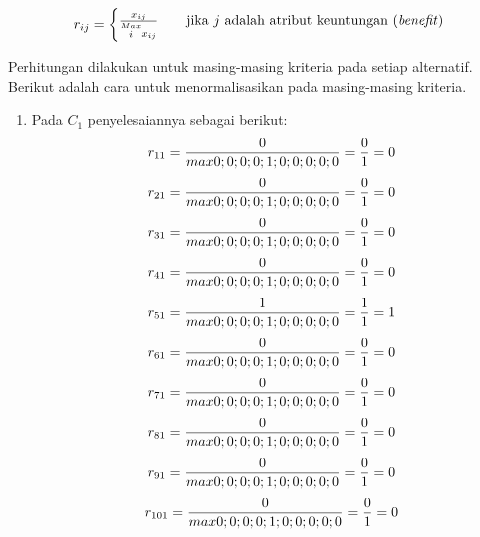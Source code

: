 \documentclass[a4paper,twoside]{article}
\begin{document}
\begin{enumerate}
	\[ r_{ij}  =
  \begin{cases}
    \frac{x_{ij}}{\stackrel{Max}{i} x_{ij}}      & \quad \text{jika } j \text{ adalah atribut keuntungan (\textit{benefit})}\\
	\end{cases}	  
\]

Perhitungan dilakukan untuk masing-masing kriteria pada setiap alternatif. Berikut adalah cara untuk menormalisasikan pada masing-masing kriteria.

\begin{enumerate}
	\item Pada $C_{1}$ penyelesaiannya sebagai berikut:
\begin{displaymath}
r_{11} = \frac{0}{max {0;0;0;0;1;0;0;0;0;0}} = \frac{0}{1} = 0\\
\end {displaymath}
\begin{displaymath}
r_{21} = \frac{0}{max {0;0;0;0;1;0;0;0;0;0}} = \frac{0}{1} = 0\\
\end{displaymath}
\begin{displaymath}
r_{31} = \frac{0}{max {0;0;0;0;1;0;0;0;0;0}} = \frac{0}{1} = 0\\
\end {displaymath}
\begin{displaymath}
r_{41} = \frac{0}{max {0;0;0;0;1;0;0;0;0;0}} = \frac{0}{1} = 0\\
\end {displaymath}
\begin{displaymath}
r_{51} = \frac{1}{max {0;0;0;0;1;0;0;0;0;0}} = \frac{1}{1} = 1\\
\end {displaymath}
\begin{displaymath}
r_{61} = \frac{0}{max {0;0;0;0;1;0;0;0;0;0}} = \frac{0}{1} = 0\\
\end {displaymath}
\begin{displaymath}
r_{71} = \frac{0}{max {0;0;0;0;1;0;0;0;0;0}} = \frac{0}{1} = 0\\
\end {displaymath}
\begin{displaymath}
r_{81} = \frac{0}{max {0;0;0;0;1;0;0;0;0;0}} = \frac{0}{1} = 0\\
\end {displaymath}
\begin{displaymath}
r_{91} = \frac{0}{max {0;0;0;0;1;0;0;0;0;0}} = \frac{0}{1} = 0\\
\end {displaymath}
\begin{displaymath}
r_{101} = \frac{0}{max {0;0;0;0;1;0;0;0;0;0}} = \frac{0}{1} = 0\\
\end {displaymath}


\end{enumerate}
\end{enumerate}
\end{document}
